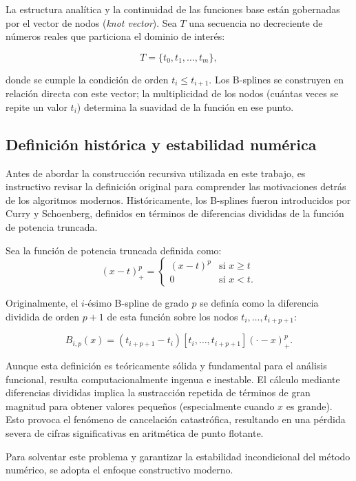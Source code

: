 \documentclass[12pt, a4paper, oneside, spanish]{book}
\begin{document}
La estructura analítica y la continuidad de las funciones base están gobernadas por el vector de nodos (\textit{knot vector}). Sea \( T \) una secuencia no decreciente de números reales que particiona el dominio de interés:

\begin{equation}
\label{eq:knot-vector}
  T = \{ t_0, t_1, \dots, t_m \},
\end{equation}

donde se cumple la condición de orden \( t_i \leq t_{i+1} \). Los B-splines se construyen en relación directa con este vector; la multiplicidad de los nodos (cuántas veces se repite un valor \( t_i \)) determina la suavidad de la función en ese punto.

\subsection{Definición histórica y estabilidad numérica}

Antes de abordar la construcción recursiva utilizada en este trabajo, es instructivo revisar la definición original para comprender las motivaciones detrás de los algoritmos modernos. Históricamente, los B-splines fueron introducidos por Curry y Schoenberg, definidos en términos de diferencias divididas de la función de potencia truncada.

Sea la función de potencia truncada definida como:
\[ (x-t)^p_+ = \begin{cases}(x-t)^p & \text{si } x \geq t \\ 0 & \text{si } x < t. \end{cases} \]

Originalmente, el \( i \)-ésimo B-spline de grado \( p \) se definía como la diferencia dividida de orden \( p+1 \) de esta función sobre los nodos \( t_i, \dots, t_{i+p+1} \):

\[ B_{i,p}(x) = (t_{i+p+1} - t_i)[t_i, \dots, t_{i+p+1}](\cdot - x)^p_+. \]

Aunque esta definición es teóricamente sólida y fundamental para el análisis funcional, resulta computacionalmente ingenua e inestable. El cálculo mediante diferencias divididas implica la sustracción repetida de términos de gran magnitud para obtener valores pequeños (especialmente cuando \( x \) es grande). Esto provoca el fenómeno de cancelación catastrófica, resultando en una pérdida severa de cifras significativas en aritmética de punto flotante.

Para solventar este problema y garantizar la estabilidad incondicional del método numérico, se adopta el enfoque constructivo moderno.
\end{document}

